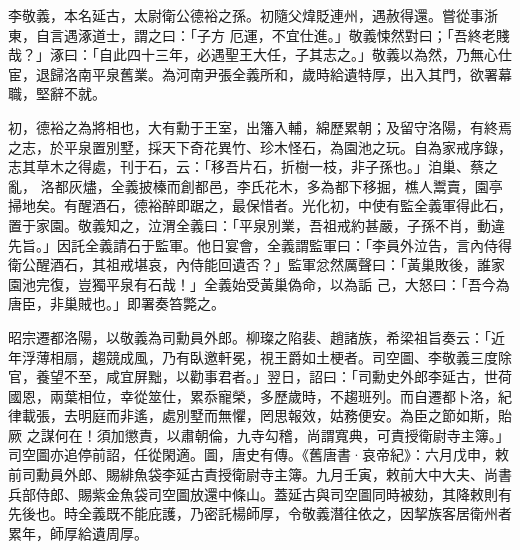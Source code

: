 \begin{pinyinscope}
 李敬義，本名延古，太尉衛公德裕之孫。初隨父煒貶連州，遇赦得還。嘗從事浙東，自言遇涿道士，謂之曰：「子方
 厄運，不宜仕進。」敬義悚然對曰；「吾終老賤哉？」涿曰：「自此四十三年，必遇聖王大任，子其志之。」敬義以為然，乃無心仕宦，退歸洛南平泉舊業。為河南尹張全義所和，歲時給遺特厚，出入其門，欲署幕職，堅辭不就。



 初，德裕之為將相也，大有勳于王室，出籓入輔，綿歷累朝；及留守洛陽，有終焉之志，於平泉置別墅，採天下奇花異竹、珍木怪石，為園池之玩。自為家戒序錄，志其草木之得處，刊于石，云：「移吾片石，折樹一枝，非子孫也。」洎巢、蔡之亂，
 洛都灰燼，全義披榛而創都邑，李氏花木，多為都下移掘，樵人鬻賣，園亭掃地矣。有醒酒石，德裕醉即踞之，最保惜者。光化初，中使有監全義軍得此石，置于家園。敬義知之，泣渭全義曰：「平泉別業，吾祖戒約甚嚴，子孫不肖，動違先旨。」因託全義請石于監軍。他日宴會，全義謂監軍曰：「李員外泣告，言內侍得衛公醒酒石，其祖戒堪哀，內侍能回遺否？」監軍忿然厲聲曰：「黃巢敗後，誰家園池完復，豈獨平泉有石哉！」全義始受黃巢偽命，以為詬
 己，大怒曰：「吾今為唐臣，非巢賊也。」即署奏笞斃之。



 昭宗遷都洛陽，以敬義為司勳員外郎。柳璨之陷裴、趙諸族，希梁祖旨奏云：「近年浮薄相扇，趨競成風，乃有臥邀軒冕，視王爵如土梗者。司空圖、李敬義三度除官，養望不至，咸宜屏黜，以勸事君者。」翌日，詔曰：「司勳史外郎李延古，世荷國恩，兩葉相位，幸從筮仕，累忝寵榮，多歷歲時，不趨班列。而自遷都卜洛，紀律載張，去明庭而非遙，處別墅而無懼，罔思報效，姑務便安。為臣之節如斯，貽厥
 之謀何在！須加懲責，以肅朝倫，九寺勾稽，尚謂寬典，可責授衛尉寺主簿。」司空圖亦追停前詔，任從閑適。圖，唐史有傳。《舊唐書·哀帝紀》：六月戊申，敕前司勳員外郎、賜緋魚袋李延古責授衛尉寺主簿。九月壬寅，敕前大中大夫、尚書兵部侍郎、賜紫金魚袋司空圖放還中條山。蓋延古與司空圖同時被劾，其降敕則有先後也。時全義既不能庇護，乃密託楊師厚，令敬義潛往依之，因挈族客居衛州者累年，師厚給遺周厚。




\end{pinyinscope}
